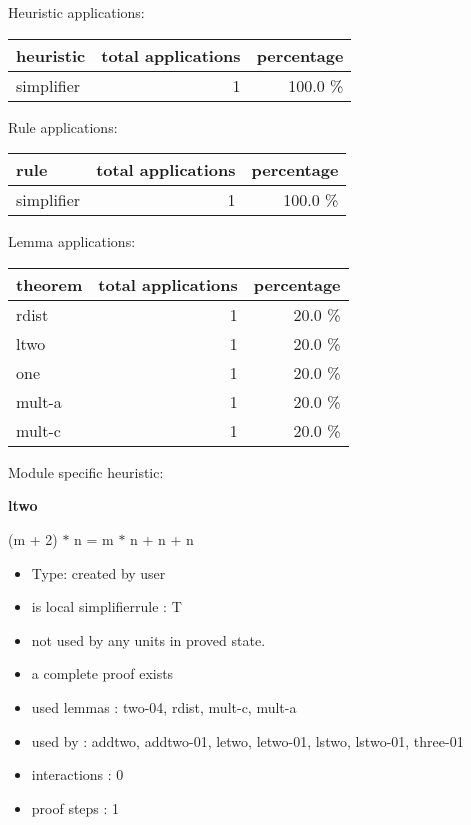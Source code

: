 \documentclass[a4paper]{article}
\begin{document}
\medskip


Heuristic applications:

\begin{supertabular}{l|r|r}
heuristic	& total applications & percentage \\ \hline
simplifier & 1 & 100.0 \% \\

\end{supertabular}

Rule applications:

\begin{supertabular}{l|r|r}
rule	        & total applications & percentage \\ \hline
simplifier & 1 & 100.0 \% \\

\end{supertabular}

Lemma applications:

\begin{supertabular}{l|r|r}
theorem	        & total applications & percentage \\ \hline
rdist & 1 & 20.0 \% \\
ltwo & 1 & 20.0 \% \\
one & 1 & 20.0 \% \\
mult-a & 1 & 20.0 \% \\
mult-c & 1 & 20.0 \% \\

\end{supertabular}

Module specific heuristic:

\pagebreak

{\LARGE\bf ltwo}\label{lemma-ltwo}

\medskip

 \Fol (m + 2) $*$ n = m $*$ n + n + n

\begin{itemize}

\item Type: created by user

\item is local simplifierrule : T
\item not used by any units in proved state.
\item       a complete proof exists
\item       used lemmas  : two-04, rdist, mult-c, mult-a
\item       used by      : addtwo, addtwo-01, letwo, letwo-01, lstwo, lstwo-01, three-01
\item       interactions : 0
\item       proof steps  : 1
\end{itemize}
\end{document}
